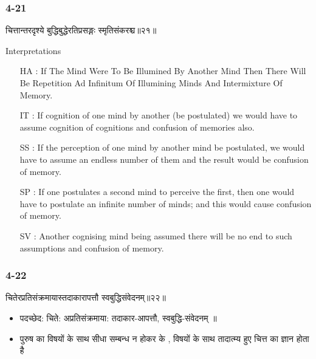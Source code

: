 \begin{frame}[fragile]\frametitle{4-21}
\begin{sanskrit}
चित्तान्तरदृश्ये बुद्धिबुद्धेरतिप्रसङ्गः स्मृतिसंकरश्च॥२१॥
\end{sanskrit}

Interpretations
\begin{itemize}	
\item [HA]: If The Mind Were To Be Illumined By Another Mind Then There Will Be Repetition Ad Infinitum Of Illumining Minds And Intermixture Of Memory.
\item [IT]: If cognition of one mind by another (be postulated) we would have to assume cognition of cognitions and confusion of memories also.
\item [SS]: If the perception of one mind by another mind be postulated, we would have to assume an endless number of them and the result would be confusion of memory.
\item [SP]: If one postulates a second mind to perceive the first, then one would have to postulate an infinite number of minds; and this would cause confusion of memory.
\item [SV]: Another cognising mind being assumed there will be no end to such assumptions and confusion of memory. 
\end{itemize}
\end{frame}

\begin{frame}[fragile]\frametitle{4-22}
\begin{sanskrit}
चितेरप्रतिसंक्रमायास्तदाकारापत्तौ स्वबुद्धिसंवेदनम्॥२२॥
\end{sanskrit}

\begin{itemize}
\item पदच्छेद: चिते: अप्रतिसंक्रमाया:‌ तदाकार-आपत्तौ, स्वबुद्धि-संवेदनम् ॥
\item पुरुष का विषयों के साथ सीधा सम्बन्ध न होकर के , विषयों के साथ तादात्म्य हुए चित्त का ज्ञान होता है
\end{itemize}
\end{frame}


